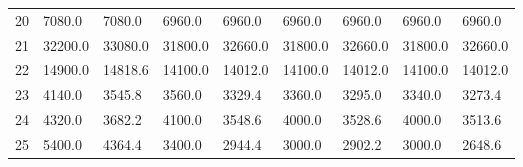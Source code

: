 \begin{tabular}{|r|l|l|l|l|l|l|l|l|}
  20 & 7080.0 & 7080.0 & 6960.0 & 6960.0 & 6960.0 & 6960.0 & 6960.0 & 6960.0 \\ 
  21 & 32200.0 & 33080.0 & 31800.0 & 32660.0 & 31800.0 & 32660.0 & 31800.0 & 32660.0 \\ 
  22 & 14900.0 & 14818.6 & 14100.0 & 14012.0 & 14100.0 & 14012.0 & 14100.0 & 14012.0 \\ 
  23 & 4140.0 & 3545.8 & 3560.0 & 3329.4 & 3360.0 & 3295.0 & 3340.0 & 3273.4 \\ 
  24 & 4320.0 & 3682.2 & 4100.0 & 3548.6 & 4000.0 & 3528.6 & 4000.0 & 3513.6 \\ 
  25 & 5400.0 & 4364.4 & 3400.0 & 2944.4 & 3000.0 & 2902.2 & 3000.0 & 2648.6 \\ 
\end{tabular}
